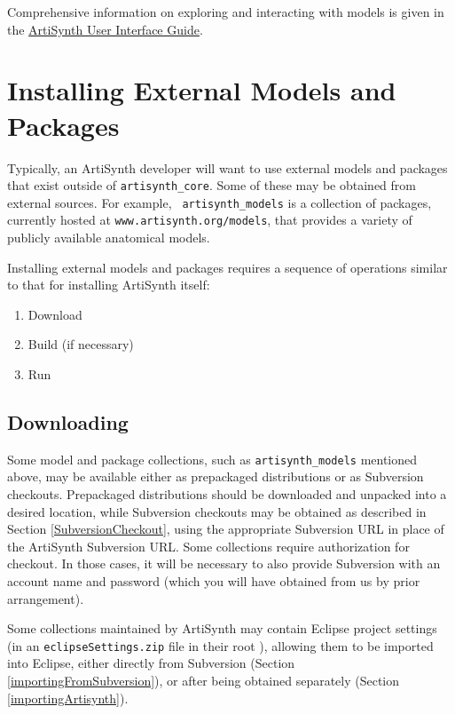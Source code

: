 Comprehensive information on exploring and interacting with models is
given in the
\href{http://www.artisynth.org/doc/html/uiguide/uiguide.html}
{ArtiSynth User Interface Guide}.

\section{Installing External Models and Packages}
\label{AdditionalModelsAndPackages}

Typically, an ArtiSynth developer will want to use external models and
packages that exist outside of {\tt artisynth\_core}.  Some of these
may be obtained from external sources.  For example, {\tt
artisynth\_models} is a collection of packages, currently hosted at
{\tt www.artisynth.org/models}, that provides a variety of publicly
available anatomical models.

Installing external models and packages requires a sequence of
operations similar to that for installing ArtiSynth itself:

\begin{enumerate}

\item Download

\item Build (if necessary)

\item Run

\end{enumerate}

\subsection{Downloading}

Some model and package collections, such as {\tt artisynth\_models}
mentioned above, may be available either as prepackaged distributions
or as Subversion checkouts. Prepackaged distributions should be
downloaded and unpacked into a desired location, while Subversion
checkouts may be obtained as described in Section
\ref{SubversionCheckout}, using the appropriate Subversion URL in
place of the ArtiSynth Subversion URL. Some collections require
authorization for checkout. In those cases, it will be necessary to
also provide Subversion with an account name and password (which you
will have obtained from us by prior arrangement).

Some collections maintained by ArtiSynth may contain Eclipse project
settings (in an {\tt eclipseSettings.zip} file in their root
\directory), allowing them to be imported into Eclipse, either
directly from Subversion (Section \ref{importingFromSubversion}), or
after being obtained separately (Section \ref{importingArtisynth}).

